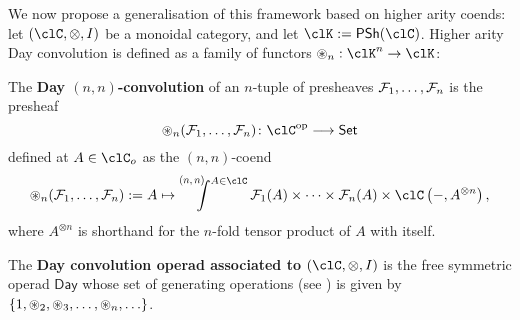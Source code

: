 \documentclass[11pt]{amsart}
\begin{document}
We now propose a generalisation of this framework based on higher arity coends: let $(\clC,\otimes,I)$ be a monoidal category, and let $\clK\defeq \PSh{\clC}$. Higher arity Day convolution is defined as a family of functors $\otimesDayN{n} : \clK^n\to \clK$:
\begin{definition}\label{nn_day_convolution}
	The \textbf{Day $(n,n)$-convolution} of an $n$-tuple of presheaves $\tpl{\mathcal{F}}$ is the presheaf
	\[\otimesDayN{n}(\tpl{\mathcal{F}})\colon\clC^{\op}\longrightarrow\mathsf{Set}\]
	defined at $A\in\clC_o$ as the $(n,n)$-coend
	\[\otimesDayN{n}(\tpl{\mathcal{F}}) \defeq A \mapsto \pqCoend{n}{n}{A\in\clC}\mathcal{F}_{1}(A)\times\cdots\times\mathcal{F}_{n}(A)\times\clC\left(-,A^{\otimes n}\right),\]
	where $A^{\otimes n}$ is shorthand for the $n$-fold tensor product of $A$ with itself.
\end{definition}
\begin{example}\label{the-day-higher-arity-convolution-operad}%
	The \textbf{Day convolution operad associated to $(\clC,\otimes,I)$} is the free symmetric operad $\mathsf{Day}$ whose set of generating operations (see \cite[Section 1.2.5]{fresse-operads}) is given by $\{1,\mathbin{\circledast}_{2},\mathbin{\circledast}_{3},\ldots,\mathbin{\circledast}_{n},\ldots\}$.
\end{example}
\end{document}

